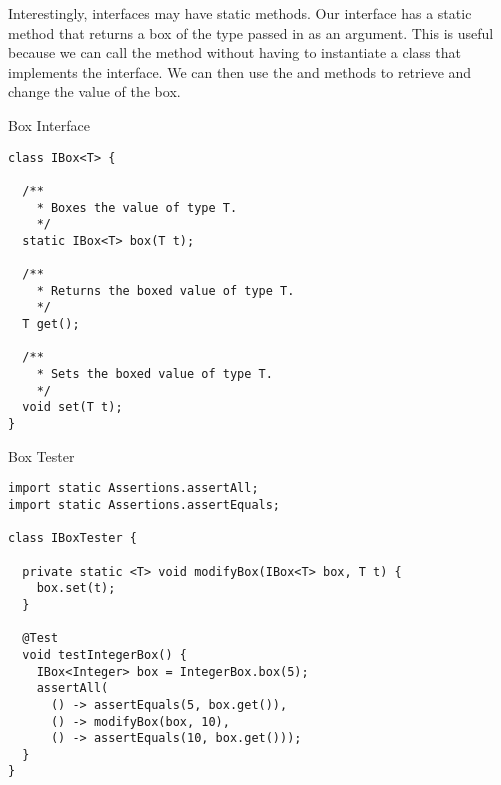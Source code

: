 

Interestingly, interfaces may have static methods. Our  interface has a static  method that returns a box of the type passed in as an argument. This is useful because we can call the  method without having to instantiate a class that implements the  interface. We can then use the  and  methods to retrieve and change the value of the box.

\begin{cl}[]{Box Interface}
\begin{lstlisting}[language=MyJava]
class IBox<T> {
  
  /**
    * Boxes the value of type T.
    */
  static IBox<T> box(T t);

  /**
    * Returns the boxed value of type T.
    */
  T get();

  /**
    * Sets the boxed value of type T.
    */
  void set(T t);
}
\end{lstlisting}
\end{cl}

\begin{cl}[]{Box Tester} 
\begin{lstlisting}[language=MyJava]
import static Assertions.assertAll;
import static Assertions.assertEquals;

class IBoxTester {

  private static <T> void modifyBox(IBox<T> box, T t) {
    box.set(t);
  }
  
  @Test
  void testIntegerBox() {
    IBox<Integer> box = IntegerBox.box(5);
    assertAll(
      () -> assertEquals(5, box.get()),
      () -> modifyBox(box, 10),
      () -> assertEquals(10, box.get()));
  }
}
\end{lstlisting}
\end{cl}

